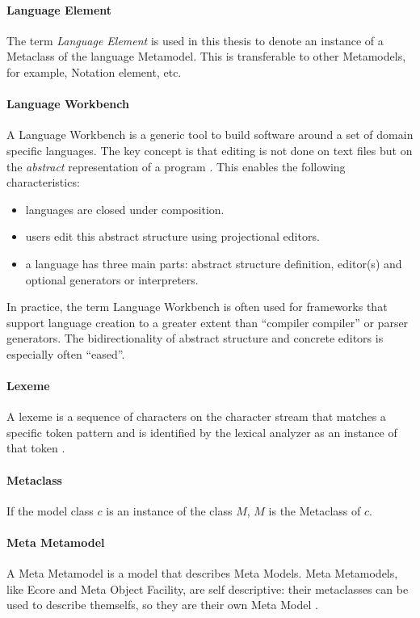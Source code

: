 \paragraph{Language Element} The term \emph{Language Element} is used in this thesis to denote an  instance of a Metaclass of the language Metamodel. This is transferable to other Metamodels, for example, Notation element, etc.

\paragraph{Language Workbench}
A Language Workbench is a generic tool to build software around a set of domain specific languages. The key concept is that editing is not done on text files but on the \emph{abstract} representation of a program \cite{Fowler}. This enables the following characteristics:
\begin{itemize}
	\item languages are closed under composition.
	\item users edit this abstract structure using projectional editors.
	\item a language has three main parts: abstract structure definition, editor(s) and optional generators or interpreters.
\end{itemize}
In practice, the term Language Workbench is often used for frameworks that support language creation to a greater extent than ``compiler compiler'' or parser generators. The bidirectionality of abstract structure and concrete editors is especially often ``eased''. 

\paragraph{Lexeme}
A lexeme is a sequence of characters on the character stream that matches a specific token pattern and is identified by the lexical analyzer as an instance of that token \cite{DragonBook}.

\paragraph{Metaclass} If the model class $c$ is an instance of the class $M$, $M$ is the Metaclass of $c$.

\paragraph{Meta Metamodel} A Meta Metamodel is a model that describes Meta Models. Meta Metamodels, like Ecore and Meta Object Facility, are self descriptive: their metaclasses can be used to describe themselfs, so they are their own Meta Model \cite{EMF2nd}. 


